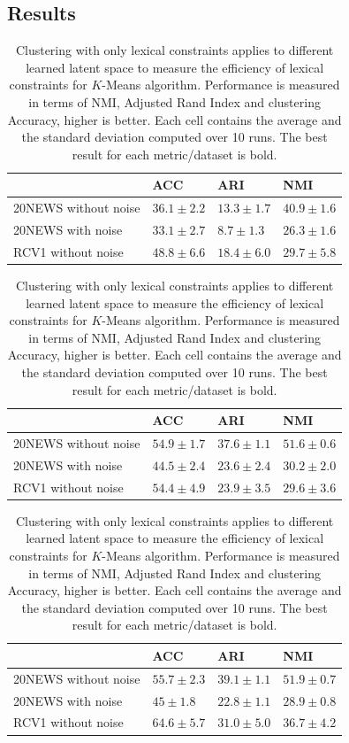 \subsection{Results}
\begin{table}[h]
\caption{\label{tab:res}Clustering with only lexical constraints applies to 
different learned latent space to measure the efficiency of lexical constraints
for $K$-Means algorithm. Performance is measured in terms of NMI, Adjusted Rand 
Index and clustering Accuracy, higher is better. Each cell contains the average
and the standard deviation computed over 10 runs. The best result for each 
metric/dataset is bold.}
\centering
  \begin{tabular}{|l|l|l|l|}
    \hline
    & ACC          &ARI           & NMI           \\ \hline
    20NEWS without noise   &$36.1 \pm 2.2$&$13.3 \pm 1.7$&$40.9 \pm 1.6$ \\ \hline
    20NEWS with noise      &$33.1 \pm 2.7$&$8.7 \pm 1.3$ &$26.3 \pm 1.6$ \\ \hline
    RCV1 without noise     &$48.8 \pm 6.6$&$18.4 \pm 6.0$&$29.7 \pm 5.8$ \\ \hline
  \end{tabular}
  \begin{tabular}{|l|l|l|l|}
    \hline
    & ACC          &ARI          & NMI          \\ \hline
    20NEWS without noise    & $54.9\pm 1.7$&$37.6\pm 1.1$&$51.6\pm 0.6$ \\ \hline
    20NEWS with noise       & $44.5\pm 2.4$&$23.6\pm 2.4$&$30.2\pm 2.0$ \\ \hline
    RCV1 without noise      &$54.4\pm 4.9$ &$23.9\pm 3.5$&$29.6\pm 3.6$ \\ \hline
  \end{tabular}
  \begin{tabular}{|l|l|l|l|}
    \hline
    & ACC                  &ARI                   & NMI                   \\ \hline
    20NEWS without noise   &$55.7\pm 2.3$  &$39.1\pm 1.1$    &$51.9\pm 0.7$ \\ \hline
    20NEWS with noise      &\boldmath$45\pm 1.8$  &\boldmath$22.8\pm 1.1$&\boldmath$28.9\pm 0.8$ \\ \hline
    RCV1 without noise     &\boldmath$64.6\pm 5.7$&\boldmath$31.0\pm 5.0$&\boldmath$36.7 \pm 4.2$  \\ \hline

\end{tabular}
\end{table}
